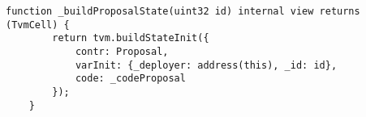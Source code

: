 \begin{lstlisting}[firstnumber=14]
    function _buildProposalState(uint32 id) internal view returns (TvmCell) {
        return tvm.buildStateInit({
            contr: Proposal,
            varInit: {_deployer: address(this), _id: id},
            code: _codeProposal
        });
    }
\end{lstlisting}
